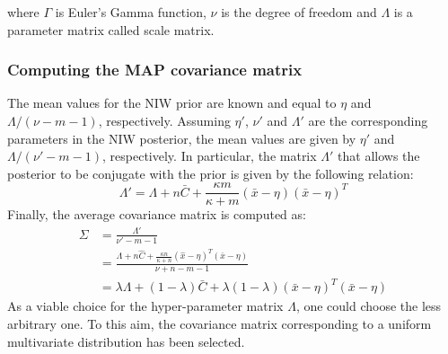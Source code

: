             where $\Gamma$ is Euler's Gamma function, $\nu$ is the degree of freedom and $\Lambda$ is a parameter matrix called scale matrix.

        \subsubsection{Computing the MAP covariance matrix}

            The mean values for the NIW prior are known and equal to $\eta$ and $\Lambda / (\nu - m - 1)$, respectively.  %
            Assuming $\eta'$, $\nu'$ and $\Lambda'$ are the corresponding parameters in the NIW posterior, the mean values are given by
            $\eta'$ and $\Lambda / (\nu' - m - 1)$, respectively. In particular, the matrix $\Lambda'$ that allows the posterior to be conjugate
            with the prior is given by the following relation:
            \begin{equation}
                \Lambda' = \Lambda + n \bar{C} + \frac{\kappa m}{\kappa + m} (\bar{x} - \eta) (\bar{x} - \eta)^T
            \end{equation}
            Finally, the average covariance matrix is computed as:
            \begin{align*}
                \Sigma & = \frac{\Lambda'}{\nu' - m - 1} \\
                & = \frac{\Lambda + n \hat{C} + \frac{\kappa n}{\kappa + n} (\hat{x} - \eta)^T (\bar{x} - \eta)}{\nu + n - m -1} \\  %
                & = \lambda \Lambda + (1 - \lambda) \bar{C} + \lambda (1 - \lambda) (\bar{x} - \eta)^T (\bar{x} - \eta)
            \end{align*}
            As a viable choice for the hyper-parameter matrix $\Lambda$, one could choose the less arbitrary one. To this aim, the covariance
            matrix corresponding to a uniform multivariate distribution has been selected.
